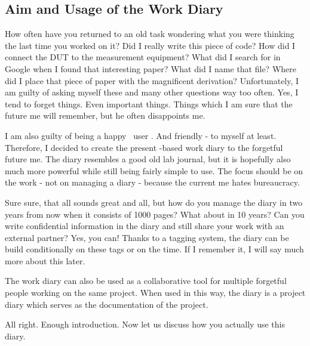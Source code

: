 \subsection{Aim and Usage of the Work Diary}
\label{task:20140315_jkn0}

How often have you returned to an old task wondering what you were thinking the last time you worked on it? Did I really write this piece of code? How did I connect the DUT to the measurement equipment? What did I search for in Google when I found that interesting paper? What did I name that file? Where did I place that piece of paper with the magnificent derivation? Unfortunately, I am guilty of asking myself these and many other questions way too often. Yes, I tend to forget things. Even important things. Things which I am sure that the future me will remember, but he often disappoints me.

I am also guilty of being a happy \LaTeXe\ user \cite{Madsen2010,Mittelbach2005,Oetiker2010}. And friendly - to myself at least. Therefore, I decided to create the present \LaTeXe-based work diary to the forgetful future me. The diary resembles a good old lab journal, but it is hopefully also much more powerful while still being fairly simple to use. The focus should be on the work - not on managing a diary - because the current me hates bureaucracy.

Sure sure, that all sounds great and all, but how do you manage the diary in two years from now when it consists of 1000 pages? What about in 10 years? Can you write confidential information in the diary and still share your work with an external partner? Yes, you can! Thanks to a tagging system, the diary can be build conditionally on these tags or on the time. If I remember it, I will say much more about this later.

The work diary can also be used as a collaborative tool for multiple forgetful people working on the same project. When used in this way, the diary is a project diary which serves as the documentation of the project.

All right. Enough introduction. Now let us discuss how you actually use this diary.

